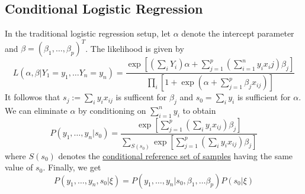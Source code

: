 \documentclass[12pt]{article}
\newcommand{\sumn}{\sum_{i=1}^n}
\numberwithin{equation}{section}
\begin{document}
\subsection{Conditional Logistic Regression}
In the traditional logistic regression setup, let $\alpha$ denote the intercept parameter and $\beta = (\beta_1, \ldots, \beta_p)^T$. The likelihood is given by
\begin{equation*}
  L(\alpha, \beta | Y_1 = y_1, \ldots Y_n = y_n) 
    = \frac{\exp[(\sum_i Y_i)\alpha + \sum_{j = 1}^p (\sumn y_i x_ij) \beta_j]}{\prod_i [1 + \exp(\alpha + \sum_{j=1}^p \beta_j x_{ij})]}
\end{equation*}
%
It followos that $s_j := \sum_i y_i x_{ij}$ is sufficent for $\beta_j$ and $s_0 = \sum_i y_i$ is sufficient for $\alpha$. We can eliminate $\alpha$ by conditioning on $\sum_{i=1}^n y_i$ to obtain
%
\begin{equation*}
  P(y_1, \ldots, y_n | s_0) = \frac{\exp[\sum_{j=1}^p (\sum_i y_i x_{ij})\beta_j]}{\sum_{S(s_0)} \exp[\sum_{j=1}^p (\sum_i y_i x_{ij}) \beta_j]}
\end{equation*}
%
where $S(s_0)$ denotes the \underline{conditional reference set of samples} having the same value of $s_0$. Finally, we get
\begin{equation*}
  P(y_1, \ldots, y_n, s_0 | \xi) = P(y_1, \ldots, y_n | s_0, \beta_1, \ldots \beta_p) P(s_0 | \xi)
\end{equation*}
\end{document}
